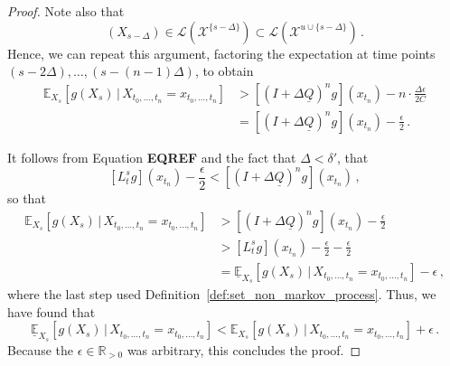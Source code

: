 \documentclass[10pt]{paper}
\newcommand{\reals}{\mathbb{R}}
\newcommand{\realspos}{\reals_{>0}}
\newcommand{\states}{\mathcal{X}}
\newcommand{\gambles}{\mathcal{L}}
\newcommand{\lrate}{\underline{Q}}
\begin{document}
\begin{proof}
Note also that
\begin{equation*}
[(I+\Delta\lrate)g](X_{s-\Delta})\in\gambles(\states^{\{s-\Delta\}})\subset\gambles(\states^{u\cup\{s-\Delta\}})\,.
\end{equation*}
Hence, we can repeat this argument, factoring the expectation at time points $(s-2\Delta),\ldots,(s-(n-1)\Delta)$, to obtain
\begin{align*}
\mathbb{E}_{X_s}[g(X_s)\,\vert\,X_{t_0,\ldots,t_n}=x_{t_0,\ldots,t_n}] &> \left[(I+\Delta\lrate)^ng\right](x_{t_n}) - n\cdot\frac{\Delta\epsilon}{2C} \\
 &= \left[(I+\Delta\lrate)^ng\right](x_{t_n}) - \frac{\epsilon}{2}\,.
\end{align*}

It follows from Equation {\bf EQREF} and the fact that $\Delta<\delta'$, that
\begin{equation*}
\left[L_t^s g\right](x_{t_n}) - \frac{\epsilon}{2} < \left[(I+\Delta\lrate)^n g\right](x_{t_n})\,,
\end{equation*}
so that
\begin{align*}
\mathbb{E}_{X_s}[g(X_s)\,\vert\,X_{t_0,\ldots,t_n}=x_{t_0,\ldots,t_n}] &> \left[(I+\Delta\lrate)^ng\right](x_{t_n}) - \frac{\epsilon}{2} \\
 &> [L_t^s g](x_{t_n}) - \frac{\epsilon}{2} - \frac{\epsilon}{2} \\
 &= \underline{\mathbb{E}}_{X_s}[g(X_s)\,\vert\,X_{t_0,\ldots,t_n}=x_{t_0,\ldots,t_n}] - \epsilon\,,
\end{align*}
where the last step used Definition~\ref{def:set_non_markov_process}. Thus, we have found that
\begin{equation*}
\underline{\mathbb{E}}_{X_s}[g(X_s)\,\vert\,X_{t_0,\ldots,t_n}=x_{t_0,\ldots,t_n}] < \mathbb{E}_{X_s}[g(X_s)\,\vert\,X_{t_0,\ldots,t_n}=x_{t_0,\ldots,t_n}] + \epsilon\,.
\end{equation*}
Because the $\epsilon\in\realspos$ was arbitrary, this concludes the proof.
\end{proof}
\end{document}
